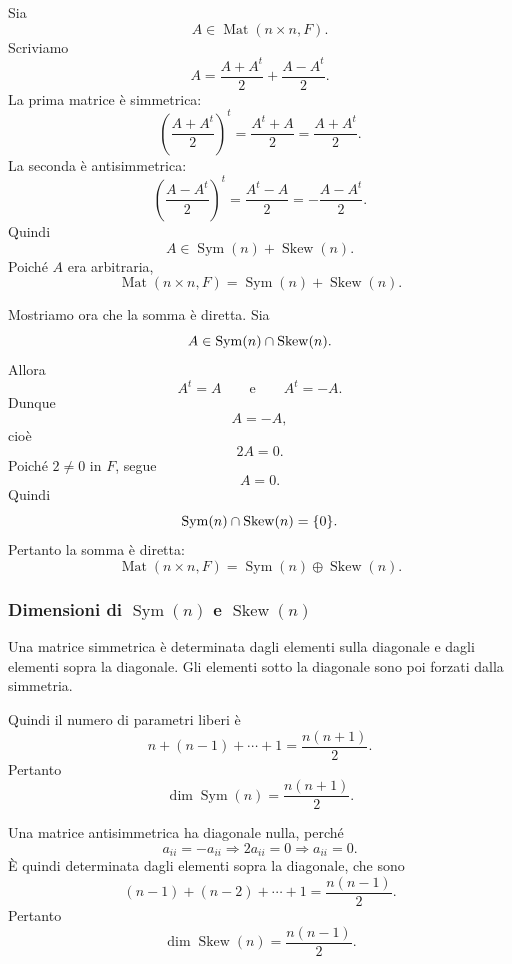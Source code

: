 \documentclass[a4paper]{article}
\begin{document}
\begin{snippetproof}{}
    Sia
    \[
        A\in\operatorname{Mat}(n\times n,F).
    \]
    Scriviamo
    \[
        A=
        \frac{A+A^t}{2}
        +
        \frac{A-A^t}{2}.
    \]
    La prima matrice è simmetrica:
    \[
        \left(\frac{A+A^t}{2}\right)^t
        =
        \frac{A^t+A}{2}
        =
        \frac{A+A^t}{2}.
    \]
    La seconda è antisimmetrica:
    \[
        \left(\frac{A-A^t}{2}\right)^t
        =
        \frac{A^t-A}{2}
        =
        -\frac{A-A^t}{2}.
    \]
    Quindi
    \[
        A\in\operatorname{Sym}(n)+\operatorname{Skew}(n).
    \]
    Poiché \(A\) era arbitraria,
    \[
        \operatorname{Mat}(n\times n,F)
        =
        \operatorname{Sym}(n)+\operatorname{Skew}(n).
    \]

    Mostriamo ora che la somma è diretta. Sia
    \[
        A\in\operatorname{Sym}(n)\cap\operatorname{Skew}(n).
    \]
    Allora
    \[
        A^t=A
        \qquad
        \text{e}
        \qquad
        A^t=-A.
    \]
    Dunque
    \[
        A=-A,
    \]
    cioè
    \[
        2A=0.
    \]
    Poiché \(2\neq 0\) in \(F\), segue
    \[
        A=0.
    \]
    Quindi
    \[
        \operatorname{Sym}(n)\cap\operatorname{Skew}(n)=\{0\}.
    \]
    Pertanto la somma è diretta:
    \[
        \operatorname{Mat}(n\times n,F)
        =
        \operatorname{Sym}(n)\oplus\operatorname{Skew}(n).
    \]
\end{snippetproof}

\subsubsection{Dimensioni di \(\operatorname{Sym}(n)\) e \(\operatorname{Skew}(n)\)}

Una matrice simmetrica è determinata dagli elementi sulla diagonale e dagli elementi sopra la diagonale. Gli elementi sotto la diagonale sono poi forzati dalla simmetria.

Quindi il numero di parametri liberi è
\[
    n+(n-1)+\cdots+1
    =
    \frac{n(n+1)}{2}.
\]
Pertanto
\[
    \dim\operatorname{Sym}(n)=\frac{n(n+1)}{2}.
\]

Una matrice antisimmetrica ha diagonale nulla, perché
\[
    a_{ii}=-a_{ii}
    \Longrightarrow
    2a_{ii}=0
    \Longrightarrow
    a_{ii}=0.
\]
È quindi determinata dagli elementi sopra la diagonale, che sono
\[
    (n-1)+(n-2)+\cdots+1
    =
    \frac{n(n-1)}{2}.
\]
Pertanto
\[
    \dim\operatorname{Skew}(n)=\frac{n(n-1)}{2}.
\]
\end{document}
